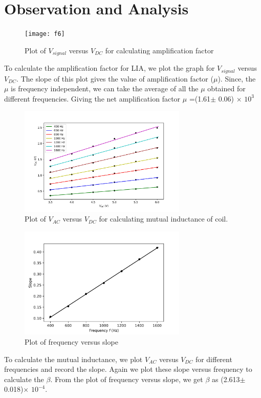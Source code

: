 \documentclass[a4paper, amsfonts, amssymb, amsmath, reprint, showkeys, nofootinbib, twoside]{revtex4-1}
\begin{document}
\section{Observation and Analysis}

\begin{figure}[H]
	\centering
	\texttt{[image: f6]} 
	\caption{Plot of $V_{signal}$ versus $V_{DC}$ for calculating amplification factor}
	\label{f6}
\end{figure}

To calculate the amplification factor for LIA, we plot the graph for $V_{signal}$ versus $V_{DC}$. The slope of this plot gives the value of amplification factor ($\mu$). Since, the $\mu$ is frequency independent, we can take the average of all the $\mu$ obtained for different frequencies. Giving the net amplification factor $\mu$ =(1.61$\pm$ 0.06) $\times$ $10^3$

\begin{figure}[h]
	\centering
	\includegraphics[width=8cm]{f7} 
	\caption{Plot of $V_{AC}$ versus $V_{DC}$ for calculating mutual inductance of coil.}
	\label{f7}
\end{figure}

\begin{figure}[h]
	\centering
	\includegraphics[width=8cm]{f8} 
	\caption{Plot of frequency versus slope}
	\label{f8}
\end{figure}

To calculate the mutual inductance, we plot $V_{AC}$ versus $V_{DC}$ for different frequencies and record the slope. Again we plot these slope versus frequency to calculate the $\beta$. From the plot of frequency versus slope, we get $\beta$ as (2.613$\pm$0.018)$\times$ $10^{-4}$. 
\end{document}
